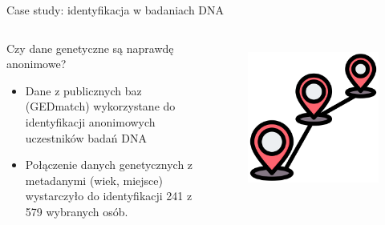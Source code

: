   
  \begin{frame}{Case study: identyfikacja w badaniach DNA}
  \begin{columns}[c]
      \begin{alertblock}{Czy dane genetyczne są naprawdę anonimowe?}
        \begin{itemize}
          \item Dane z publicznych baz (GEDmatch) wykorzystane do identyfikacji anonimowych uczestników badań DNA
          \item Połączenie danych genetycznych z metadanymi (wiek, miejsce) wystarczyło do identyfikacji 241 z 579 wybranych osób.\cite{DNA_LEAK}
        \end{itemize}
      \end{alertblock}
      \begin{figure}
        \centering
        \includegraphics[height=0.45\textheight]{images/routing.png}
        \label{fig:dnaCase}
      \end{figure}
  \end{columns}
  \end{frame}
  
  
